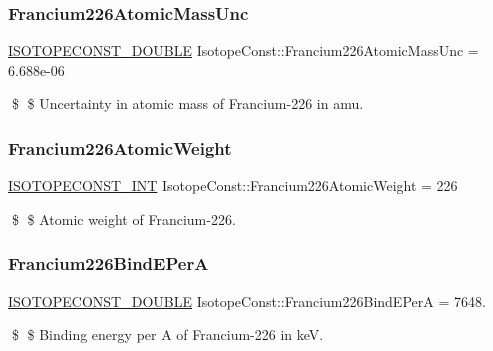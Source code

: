 \subsubsection{\texorpdfstring{Francium226\+Atomic\+Mass\+Unc}{Francium226AtomicMassUnc}}
{\footnotesize\ttfamily \mbox{\hyperlink{group___isotope_const-_macros_ga8f45a7272ce02c0b4c65c44636ed719a}{I\+S\+O\+T\+O\+P\+E\+C\+O\+N\+S\+T\+\_\+\+D\+O\+U\+B\+LE}} Isotope\+Const\+::\+Francium226\+Atomic\+Mass\+Unc = 6.\+688e-\/06}

\$ \$ Uncertainty in atomic mass of Francium-\/226 in amu. \mbox{\label{group___isotope_const-_francium-_fr226_ga0069583a3822c50b64b4febb2f8abb1f}} 
\subsubsection{\texorpdfstring{Francium226\+Atomic\+Weight}{Francium226AtomicWeight}}
{\footnotesize\ttfamily \mbox{\hyperlink{group___isotope_const-_macros_ga5f18360b3e99483a35c32d789e62621c}{I\+S\+O\+T\+O\+P\+E\+C\+O\+N\+S\+T\+\_\+\+I\+NT}} Isotope\+Const\+::\+Francium226\+Atomic\+Weight = 226}

\$ \$ Atomic weight of Francium-\/226. \mbox{\label{group___isotope_const-_francium-_fr226_gac672a1e46d7a861a10f3a66b97585d64}} 
\subsubsection{\texorpdfstring{Francium226\+Bind\+E\+PerA}{Francium226BindEPerA}}
{\footnotesize\ttfamily \mbox{\hyperlink{group___isotope_const-_macros_ga8f45a7272ce02c0b4c65c44636ed719a}{I\+S\+O\+T\+O\+P\+E\+C\+O\+N\+S\+T\+\_\+\+D\+O\+U\+B\+LE}} Isotope\+Const\+::\+Francium226\+Bind\+E\+PerA = 7648.}

\$ \$ Binding energy per A of Francium-\/226 in keV. \mbox{\label{group___isotope_const-_francium-_fr226_gaa8289a845948a47904708889b8316180}} 
